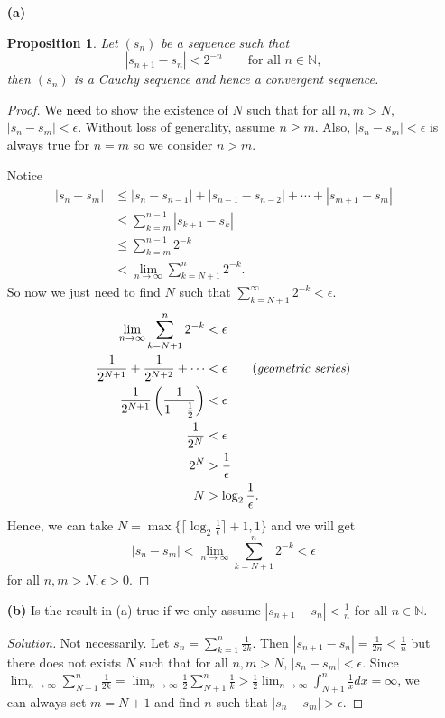 \documentclass{article}
\newtheorem{proposition}[thm]{Proposition}
\begin{document}
\begin{enumerate}
    \item [\textbf{(a)}]
    \begin{proposition}
        Let $(s_n)$ be a sequence such that 
        $$|s_{n+1}-s_n|<2^{-n}\qquad \text{for all } n\in\mathbb{N},$$
        then $(s_n)$ is a Cauchy sequence and hence a convergent sequence.
    \end{proposition}
    \begin{proof}
        We need to show the existence of $N$ such that for all $n,m>N$, $|s_n-s_m|<\epsilon$. 
        Without loss of generality, assume $n\ge m$. Also, $|s_n-s_m|<\epsilon$ is always true 
        for $n=m$ so we consider $n>m$.

        Notice 
        \begin{align*}
            |s_n-s_m| & \le |s_n-s_{n-1}|+|s_{n-1}-s_{n-2}|+\cdots+|s_{m+1}-s_m| \\
            & \le \sum_{k=m}^{n-1}|s_{k+1}-s_k| \\
            & \le \sum_{k=m}^{n-1}2^{-k} \\
            & < \lim_{n\to\infty}\sum_{k=N+1}^{n}2^{-k}.
        \end{align*}
        So now we just need to find $N$ such that $\sum_{k=N+1}^{\infty}2^{-k}<\epsilon$.
        \begin{align*}
            \lim_{n\to\infty}\sum_{k=N+1}^{n}2^{-k} & < \epsilon \\
            \frac{1}{2^{N+1}} + \frac{1}{2^{N+2}} + \cdots & < \epsilon \qquad (\emph{geometric series})\\
            \frac{1}{2^{N+1}} \left(\frac{1}{1-\frac{1}{2}}\right) & < \epsilon \\
            \frac{1}{2^N}  & < \epsilon \\
            2^N & > \frac{1}{\epsilon} \\
            N & > \log_2\frac{1}{\epsilon}.
        \end{align*}
        Hence, we can take $N=\max\{\lceil\log_2\frac{1}{\epsilon}\rceil + 1, 1\}$ and we will get 
        $$|s_n-s_m| < \lim_{n\to\infty}\sum_{k=N+1}^{n}2^{-k} < \epsilon$$
        for all $n,m>N, \epsilon>0$.
    \end{proof}
    
    \item[\textbf{(b)}]
    Is the result in (a) true if we only assume $|s_{n+1}-s_n|<\frac{1}{n}$ for all $n\in\mathbb{N}$.
    \begin{proof}[Solution]
        Not necessarily. Let $s_n=\sum_{k=1}^{n}\frac{1}{2k}$. Then $|s_{n+1}-s_n| = \frac{1}{2n}<
        \frac{1}{n}$ but there does not exists $N$ such that for all $n,m>N$, $|s_n-s_m|<\epsilon$.
        Since $\lim_{n\to\infty}\sum_{N+1}^{n}\frac{1}{2k} = \lim_{n\to\infty}\frac{1}{2}\sum_{N+1}^{n}\frac{1}{k} > 
        \frac{1}{2}\lim_{n\to\infty}\int_{N+1}^{n}\frac{1}{x}dx = \infty$, we can always set 
        $m=N+1$ and find $n$ such that $|s_n-s_m|>\epsilon$.
    \end{proof}
\end{enumerate}
\end{document}
